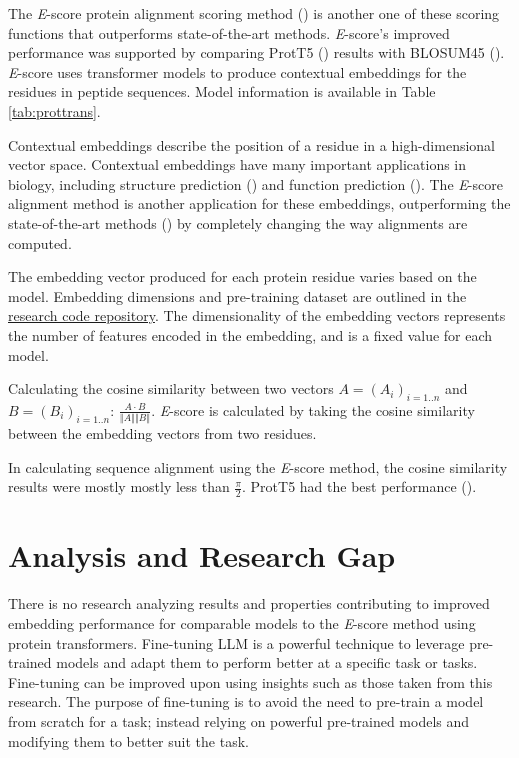 The \textit{E}-score protein alignment scoring method (\cite{Ashrafzadeh:2023}) is another one of these scoring functions that outperforms state-of-the-art methods. \textit{E}-score's improved performance was supported by comparing ProtT5 (\cite{Elnaggar:2021}) results with BLOSUM45 (\cite{Henikoff:1992,Ashrafzadeh:2023}). \textit{E}-score uses \gls{transformer} models to produce contextual embeddings for the \glspl{residue} in \gls{peptide} sequences. Model information is available in Table \ref{tab:prottrans}.

Contextual embeddings describe the position of a \gls{residue} in a high-dimensional vector space. Contextual embeddings have many important applications in biology, including structure prediction (\cite{Senior:2020, Yang:2019, Jumper:2021}) and function prediction (\cite{Kulmanov:2019, Gligorijevic:2021, Lai:2021}). The \textit{E}-score alignment method is another application for these embeddings, outperforming the state-of-the-art methods (\cite{Ashrafzadeh:2023}) by completely changing the way alignments are computed.

The embedding vector produced for each protein \gls{residue} varies based on the model. Embedding dimensions and pre-training dataset are outlined in the \href{https://github.com/rgavigan/e-score/blob/main/README.md}{research code repository}. The dimensionality of the embedding vectors represents the number of features encoded in the embedding, and is a fixed value for each model.

Calculating the cosine similarity between two vectors \(A = (A_i)_{i=1..n}\) and \(B = (B_i)_{i=1..n}\): \(\frac{A \cdot B}{\Vert A \Vert \Vert B \Vert}\). \textit{E}-score is calculated by taking the cosine similarity between the embedding vectors from two \glspl{residue}.

In calculating sequence alignment using the \textit{E}-score method, the cosine similarity results were mostly mostly less than \(\frac{\pi}{2}\). ProtT5 had the best performance (\cite{Ashrafzadeh:2023}).

\section{Analysis and Research Gap}
There is no research analyzing results and properties contributing to improved embedding performance for comparable models to the \textit{E}-score method using protein transformers. Fine-tuning \gls{LLM} is a powerful technique to leverage pre-trained models and adapt them to perform better at a specific task or tasks. Fine-tuning can be improved upon using insights such as those taken from this research. The purpose of fine-tuning is to avoid the need to pre-train a model from scratch for a task; instead relying on powerful pre-trained models and modifying them to better suit the task.

